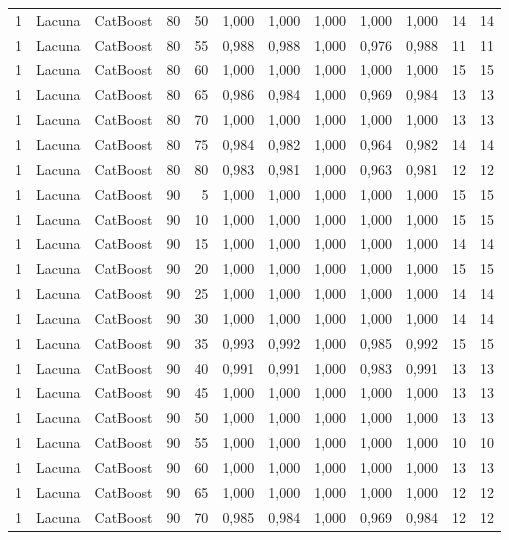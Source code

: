 \begin{longtable}{@{}rllrrrrrrrrr@{}}
1 & Lacuna & CatBoost & 80 & 50 & 1,000 & 1,000 & 1,000 & 1,000 & 1,000 & 14 & 14 \\
1 & Lacuna & CatBoost & 80 & 55 & 0,988 & 0,988 & 1,000 & 0,976 & 0,988 & 11 & 11 \\
1 & Lacuna & CatBoost & 80 & 60 & 1,000 & 1,000 & 1,000 & 1,000 & 1,000 & 15 & 15 \\
1 & Lacuna & CatBoost & 80 & 65 & 0,986 & 0,984 & 1,000 & 0,969 & 0,984 & 13 & 13 \\
1 & Lacuna & CatBoost & 80 & 70 & 1,000 & 1,000 & 1,000 & 1,000 & 1,000 & 13 & 13 \\
1 & Lacuna & CatBoost & 80 & 75 & 0,984 & 0,982 & 1,000 & 0,964 & 0,982 & 14 & 14 \\
1 & Lacuna & CatBoost & 80 & 80 & 0,983 & 0,981 & 1,000 & 0,963 & 0,981 & 12 & 12 \\
1 & Lacuna & CatBoost & 90 & 5 & 1,000 & 1,000 & 1,000 & 1,000 & 1,000 & 15 & 15 \\
1 & Lacuna & CatBoost & 90 & 10 & 1,000 & 1,000 & 1,000 & 1,000 & 1,000 & 15 & 15 \\
1 & Lacuna & CatBoost & 90 & 15 & 1,000 & 1,000 & 1,000 & 1,000 & 1,000 & 14 & 14 \\
1 & Lacuna & CatBoost & 90 & 20 & 1,000 & 1,000 & 1,000 & 1,000 & 1,000 & 15 & 15 \\
1 & Lacuna & CatBoost & 90 & 25 & 1,000 & 1,000 & 1,000 & 1,000 & 1,000 & 14 & 14 \\
1 & Lacuna & CatBoost & 90 & 30 & 1,000 & 1,000 & 1,000 & 1,000 & 1,000 & 14 & 14 \\
1 & Lacuna & CatBoost & 90 & 35 & 0,993 & 0,992 & 1,000 & 0,985 & 0,992 & 15 & 15 \\
1 & Lacuna & CatBoost & 90 & 40 & 0,991 & 0,991 & 1,000 & 0,983 & 0,991 & 13 & 13 \\
1 & Lacuna & CatBoost & 90 & 45 & 1,000 & 1,000 & 1,000 & 1,000 & 1,000 & 13 & 13 \\
1 & Lacuna & CatBoost & 90 & 50 & 1,000 & 1,000 & 1,000 & 1,000 & 1,000 & 13 & 13 \\
1 & Lacuna & CatBoost & 90 & 55 & 1,000 & 1,000 & 1,000 & 1,000 & 1,000 & 10 & 10 \\
1 & Lacuna & CatBoost & 90 & 60 & 1,000 & 1,000 & 1,000 & 1,000 & 1,000 & 13 & 13 \\
1 & Lacuna & CatBoost & 90 & 65 & 1,000 & 1,000 & 1,000 & 1,000 & 1,000 & 12 & 12 \\
1 & Lacuna & CatBoost & 90 & 70 & 0,985 & 0,984 & 1,000 & 0,969 & 0,984 & 12 & 12 \\

\end{longtable}
